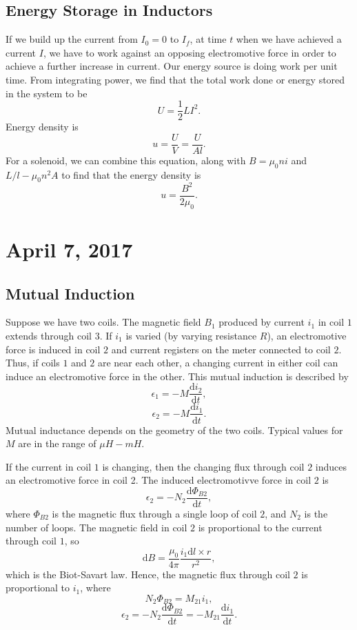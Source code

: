 \documentclass[11pt]{article}
\theoremstyle{plain} %
\theoremstyle{definition}
\theoremstyle{example}
\theoremstyle{remark}
\begin{document}
\subsection{Energy Storage in Inductors}
If we build up the current from $I_0=0$ to $I_f$, at time $t$ when we have achieved a current $I$, we have to work against an opposing electromotive force in order to achieve a further increase in current. Our energy source is doing work per unit time. From integrating power, we find that the total work done or energy stored in the system to be 
$$U =  \frac{1}{2}LI^2.$$Energy density is 
$$u=\frac{U}{V} = \frac{U}{Al}.$$
For a solenoid, we can combine this equation, along with $B=\mu_0ni$ and $L/l-\mu_0n^2A$ to find that the energy density is 
$$u= \frac{B^2}{2\mu_0}.$$

\section{April 7, 2017}
\subsection{Mutual Induction}
Suppose we have two coils. The magnetic field $B_1$ produced by current $i_1$ in coil $1$ extends through coil 3. If $i_1$ is varied (by varying resistance $R$), an electromotive force is induced in coil $2$ and current registers on the meter connected to coil $2$. Thus, if coils $1$ and $2$ are near each other, a changing current in either coil can induce an electromotive force in the other. This mutual induction is described by 
$$\epsilon_1 = -M\frac{\mathrm d i_2}{\mathrm d t},$$
$$\epsilon_2= -M\frac{\mathrm d i_1}{\mathrm d t}.$$
Mutual inductance depends on the geometry of the two coils. Typical values for $M$ are in the range of $\mu H-mH$. 

If the current in coil $1$ is changing, then the changing flux through coil $2$ induces an electromotive force in coil 2. The induced electromotivve force in coil $2$ is 
$$\epsilon_2 = -N_2\frac{\mathrm d \Phi_{B2}}{\mathrm d t},$$
where $\Phi_{B2}$ is the magnetic flux through a single loop of coil $2$, and $N_2$ is the number of loops. The magnetic field in coil $2$ is proportional to the current through coil $1$, so 
$$\mathrm d B = \frac{\mu_0}{4\pi} \frac{i_1\mathrm d l \times r}{r^2},$$
which is the Biot-Savart law. Hence, the magnetic flux through coil $2$ is proportional to $i_1$, where 
$$N_2\Phi_{B2} = M_{21}i_1,$$
$$\epsilon_2 = -N_2\frac{\mathrm d \Phi_{B2}}{\mathrm d t} = -M_{21}\frac{\mathrm d i_1}{\mathrm d t}.$$
\end{document}
